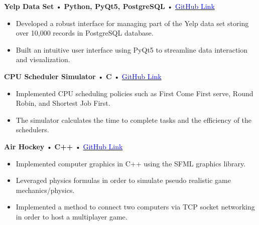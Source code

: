 \documentclass[10pt]{article}
\newcommand{\nicelink}[2]{%
    \href{#1}{\textcolor{blue}{#2}}%
}
\newcommand{\project}[4]{%
  {\textbf{#1}} • {\textbf{#2}} • {\nicelink{#3}{GitHub Link}} \\[-2pt]%
  \vspace{-10pt}
  #4%
  \vspace{4pt}%
}
\begin{document}
    \project
        {Yelp Data Set}
        {Python, PyQt5, PostgreSQL}
        {https://github.com/SamStan4/yelp-data-set/tree/main}
        {%
            \begin{itemize}
                \item Developed a robust interface for managing part of the Yelp data set storing over 10,000 records in PostgreSQL database.
                \item Built an intuitive user interface using PyQt5 to streamline data interaction and visualization.
            \end{itemize}
        }

    \project
        {CPU Scheduler Simulator}
        {C}
        {https://github.com/SamStan4/CPU-scheduling-simulator}
        {%
            \begin{itemize}
                \item Implemented CPU scheduling policies such as First Come First serve, Round Robin, and Shortest Job First.
                \item The simulator calculates the time to complete tasks and the efficiency of the schedulers.
            \end{itemize}
        }

    \project
        {Air Hockey}
        {C++}
        {https://github.com/SamStan4/air_hockey}
        {%
            \begin{itemize}
                \item Implemented computer graphics in C++ using the SFML graphics library.
                \item Leveraged physics formulas in order to simulate pseudo realistic game mechanics/physics.
                \item Implemented a method to connect two computers via TCP socket networking in order to host a multiplayer game.
            \end{itemize}
        }
\end{document}
